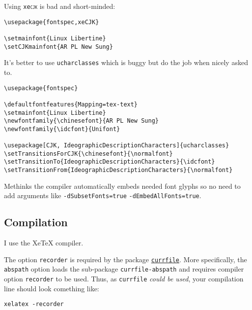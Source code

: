 Using \texttt{xe\textsc{cjk}} is bad and short-minded:
\begin{lstlisting}
\usepackage{fontspec,xeCJK}

\setmainfont{Linux Libertine}
\setCJKmainfont{AR PL New Sung}
\end{lstlisting}

It's better to use \texttt{ucharclasses} which is buggy but do the job when nicely asked to.
\begin{lstlisting}
\usepackage{fontspec}

\defaultfontfeatures{Mapping=tex-text}
\setmainfont{Linux Libertine}
\newfontfamily{\chinesefont}{AR PL New Sung}
\newfontfamily{\idcfont}{Unifont}

\usepackage[CJK, IdeographicDescriptionCharacters]{ucharclasses}
\setTransitionsForCJK{\chinesefont}{\normalfont}
\setTransitionTo{IdeographicDescriptionCharacters}{\idcfont}
\setTransitionFrom{IdeographicDescriptionCharacters}{\normalfont}
\end{lstlisting}

Methinks the compiler automatically embeds needed font glyphs so no need to add arguments like \texttt{-dSubsetFonts=true} \texttt{-dEmbedAllFonts=true}.

\subsection{Compilation}

I use the Xe\TeX{} compiler.

The option \texttt{recorder} is required by the package \href{http://www.ctan.org/tex-archive/macros/latex/contrib/currfile}{\texttt{currfile}}. More specifically, the \texttt{abspath} option loads the sub-package \texttt{currfile-abspath} and requires compiler option \texttt{recorder} to be used. Thus, as \texttt{currfile} \textsl{could be used}, your compilation line should look comething like:

\begin{lstlisting}
xelatex -recorder
\end{lstlisting}
